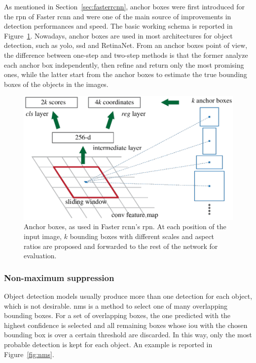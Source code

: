 \documentclass[%
    corpo=12pt,
    twoside,
    stile=classica,   
    tipotesi=magistrale,
    evenboxes,
    english,
	numerazioneromana,
]{toptesi}
\begin{document}
As mentioned in Section~\ref{sec:fasterrcnn}, anchor boxes were first introduced for the \gls{rpn} of Faster \gls{rcnn} and were one of the main source of improvements in detection performances and speed\cite{ren2016faster}. The basic working schema is reported in Figure~\ref{fig:rpn}. Nowadays, anchor boxes are used in most architectures for object detection, such as \gls{yolo}, \gls{ssd} and RetinaNet. From an anchor boxes point of view, the difference between one-step and two-step methods is that the former analyze each anchor box independently, then refine and return only the most promising ones, while the latter start from the anchor boxes to estimate the true bounding boxes of the objects in the images.

\begin{figure}[tb]
	\centering
	\includegraphics[width=.7\linewidth]{imgs/rpn.png}
	\caption{Anchor boxes, as used in Faster \gls{rcnn}'s \gls{rpn}\cite{ren2016faster}. At each position of the input image, $k$ bounding boxes with different scales and aspect ratios are proposed and forwarded to the rest of the network for evaluation.}
	\label{fig:rpn}
\end{figure}

\subsubsection{Non-maximum suppression}
Object detection models usually produce more than one detection for each object, which is not desirable. \Gls{nms} is a method to select one of many overlapping bounding boxes. For a set of overlapping boxes, the one predicted with the highest confidence is selected and all remaining boxes whose \gls{iou} with the chosen bounding box is over a certain threshold are discarded. In this way, only the most probable detection is kept for each object. An example is reported in Figure~\ref{fig:nms}.
\end{document}
